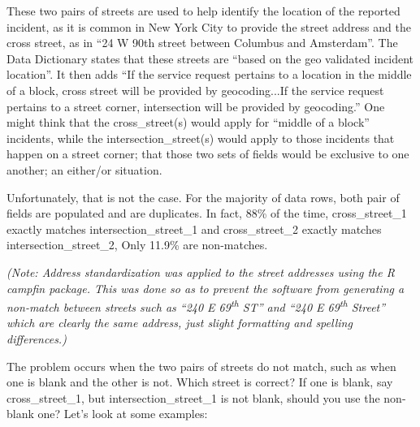 \documentclass[12pt, titlepage]{article}
\begin{document}
These two pairs of streets are used to help identify the location of the 
reported incident, as it is common in New York City to provide the 
street address and the cross street, as in ``24 W 90th street between 
Columbus and Amsterdam''. The Data Dictionary states that these 
streets are ``based on the geo validated incident location''. It then 
adds ``If the service request pertains to a location in the middle of a 
block, cross street will be provided by geocoding...If the service 
request pertains to a street corner, intersection will be provided by 
geocoding.''  One might think that the cross\_street(s) would apply 
for ``middle of a block'' incidents, while the intersection\_street(s) 
would apply to those incidents that happen on a street corner; 
that those two sets of fields would be exclusive to one another; 
an either/or situation. 

Unfortunately, that is not the case. For the majority of data rows, both 
pair of fields are populated and are duplicates. In fact, 88\% of the 
time, cross\_street\_1 exactly matches intersection\_street\_1 and 
cross\_street\_2 exactly matches intersection\_street\_2, Only 
11.9\% are non-matches.

\textit{(Note: Address standardization was applied to the street 
addresses using the R \emph{campfin} package. This was done so as 
to prevent the software from generating a non-match between 
streets such as ``240 E 69\textsuperscript{th} ST'' and ``240 E 
69\textsuperscript{th} Street'' which are clearly the same address, 
just slight formatting and spelling differences.)}

The problem occurs when the two pairs of streets do not match, such as 
when one is blank and the other is not. Which street is correct? If one 
is blank, say cross\_street\_1, but  intersection\_street\_1 is not blank, should 
you use the non-blank one?  Let's look at some examples:
\end{document}
